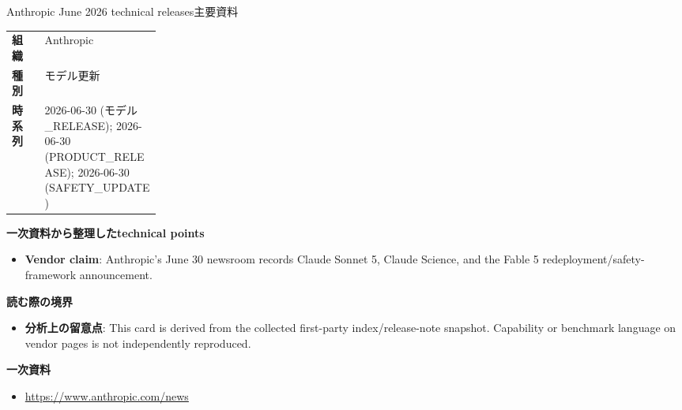 \begin{technicalnote}{Anthropic June 2026 technical releases}{主要資料}
\begin{tabularx}{\linewidth}{@{}>{\bfseries}p{0.22\linewidth}X@{}}
組織 & Anthropic \\
種別 & モデル更新 \\
時系列 & 2026-06-30 (モデル\_RELEASE); 2026-06-30 (PRODUCT\_RELEASE); 2026-06-30 (SAFETY\_UPDATE) \\
\end{tabularx}
\smallskip
{\bfseries 一次資料から整理したtechnical points}
\begin{itemize}[leftmargin=1.5em,itemsep=0.35em]
\item \textbf{Vendor claim}: Anthropic's June 30 newsroom records Claude Sonnet 5, Claude Science, and the Fable 5 redeployment/safety-framework announcement.
\end{itemize}
{\bfseries 読む際の境界}
\begin{itemize}[leftmargin=1.5em,itemsep=0.35em]
\item \textbf{分析上の留意点}: This card is derived from the collected first-party index/release-note snapshot. Capability or benchmark language on vendor pages is not independently reproduced.
\end{itemize}
{\bfseries 一次資料}
\begingroup\sloppy
\begin{itemize}[leftmargin=1.5em,itemsep=0.25em]
\item {\scriptsize\url{https://www.anthropic.com/news}}
\end{itemize}
\endgroup
\end{technicalnote}
\medskip

